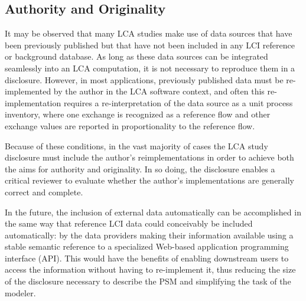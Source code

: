 \subsection{Authority and Originality}

It may be observed that many LCA studies make use of data sources that have been previously published but that have not been included in any LCI reference or background database.  As long as these data sources can be integrated seamlessly into an LCA computation, it is not necessary to reproduce them in a disclosure.  However, in most applications, previously published data must be re-implemented by the author in the LCA software context, and often this re-implementation requires a re-interpretation of the data source as a unit process inventory, where one exchange is recognized as a reference flow and other exchange values are reported in proportionality to the reference flow.

Because of these conditions, in the vast majority of cases the LCA study disclosure must include the author's reimplementations in order to achieve both the aims for authority and originality.  In so doing, the disclosure enables a critical reviewer to evaluate whether the author's implementations are generally correct and complete.

In the future, the inclusion of external data automatically can be accomplished in the same way that reference LCI data could conceivably be included automatically: by the data providers making their information available  using a stable semantic reference to a specialized Web-based application programming interface (API).  This would have the benefits of enabling downstream users to access the information without having to re-implement it, thus reducing the size of the disclosure necessary to describe the PSM and simplifying the task of the modeler.
